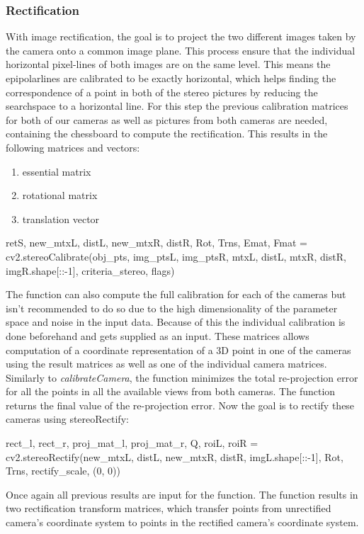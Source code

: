 \documentclass[journal,onecolumn]{IEEEtran}
\begin{document}
\subsubsection{Rectification}
\noindent
With image rectification, the goal is to project the two different images taken by the camera onto a common image plane. This process ensure that the individual horizontal pixel-lines of both images are on the same level. This means the epipolarlines are calibrated to be exactly horizontal, which helps finding the correspondence of a point in both of the stereo pictures by reducing the searchspace to a horizontal line.
For this step the previous calibration matrices for both of our cameras as well as pictures from both cameras are needed, containing the chessboard to compute the rectification. This results in the following matrices and vectors:
\begin{enumerate}
	\item essential matrix
	\item rotational matrix
	\item translation vector
\end{enumerate}

\begin{python}
retS, new_mtxL, distL, new_mtxR, distR, Rot, Trns, Emat, Fmat = cv2.stereoCalibrate(obj_pts,
 										img_ptsL,
 										img_ptsR,
 										mtxL, distL,
 										mtxR, distR,
 										imgR.shape[::-1],
 										criteria_stereo,
 										flags)
\end{python}
The function can also compute the full calibration for each of the cameras but isn't recommended to do so due to the high dimensionality of the parameter space and noise in the input data\cite{stereoCalibrate}. Because of this the individual calibration is done beforehand and gets supplied as an input.
These matrices allows computation of a coordinate representation of a 3D point in one of the cameras using the result matrices as well as one of the individual camera matrices.
Similarly to \emph{calibrateCamera}, the function minimizes the total re-projection error for all the points in all the available views from both cameras. The function returns the final value of the re-projection error.
Now the goal is to rectify these cameras using stereoRectify:
\begin{python}
rect_l, rect_r, proj_mat_l, proj_mat_r, Q, roiL, roiR = cv2.stereoRectify(new_mtxL,
 										distL,
 										new_mtxR,
 										distR,
 										imgL.shape[::-1],
  										Rot, Trns,
  										rectify_scale,
 										(0, 0))
\end{python}
Once again all previous results are input for the function. The function results in two rectification transform matrices, which transfer points from unrectified camera's coordinate system to points in the rectified camera's coordinate system.
\end{document}
